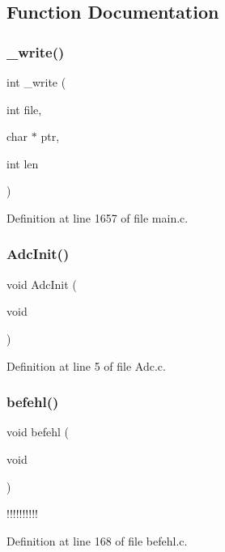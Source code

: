 \subsection{Function Documentation}
\mbox{\label{main_8c_aa025a12d45f60c7d0eae249e61f0c7f9}} 
\subsubsection{\+\_\+write()}
{\footnotesize\ttfamily int \+\_\+write (\begin{DoxyParamCaption}\item[{int}]{file,  }\item[{char $\ast$}]{ptr,  }\item[{int}]{len }\end{DoxyParamCaption})}



Definition at line 1657 of file main.\+c.

\mbox{\label{main_8c_a5ac508fc2087ee41c1458b98f0f4e475}} 
\subsubsection{Adc\+Init()}
{\footnotesize\ttfamily void Adc\+Init (\begin{DoxyParamCaption}\item[{void}]{ }\end{DoxyParamCaption})}



Definition at line 5 of file Adc.\+c.

\mbox{\label{main_8c_abea6cead6dcc33be4b61c0a03864d0de}} 
\subsubsection{befehl()}
{\footnotesize\ttfamily void befehl (\begin{DoxyParamCaption}\item[{void}]{ }\end{DoxyParamCaption})}

!!!!!!!!!! 

Definition at line 168 of file befehl.\+c.

\mbox{\label{main_8c_a1580373cc3bde1410bd031397e6713ec}} 
